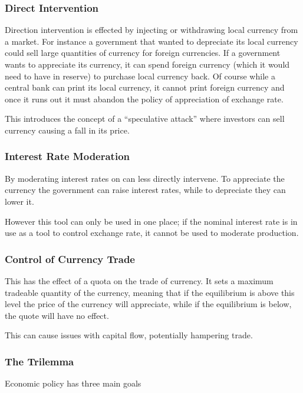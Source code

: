 \documentclass[12pt]{report}
\begin{document}
\begin{flushleft}
\subsubsection*{Direct Intervention}

Direction intervention is effected by injecting or withdrawing local currency
from a market. For instance a government that wanted to depreciate its local
currency could sell large quantities of currency for foreign currencies. If
a government wants to appreciate its currency, it can spend foreign currency
(which it would need to have in reserve) to purchase local currency back. Of
course while a central bank can print its local currency, it cannot print
foreign currency and once it runs out it must abandon the policy of
appreciation of exchange rate. \par
This introduces the concept of a ``speculative attack'' where investors can
sell currency causing a fall in its price.

\subsubsection*{Interest Rate Moderation}

By moderating interest rates on can less directly intervene. To appreciate the
currency the government can raise interest rates, while to depreciate they can
lower it. \par
However this tool can only be used in one place; if the nominal interest rate
is in use as a tool to control exchange rate, it cannot be used to moderate
production.

\subsubsection*{Control of Currency Trade}

This has the effect of a quota on the trade of currency. It sets a maximum
tradeable quantity of the currency, meaning that if the equilibrium is above
this level the price of the currency will appreciate, while if the equilibrium
is below, the quote will have no effect. \par
This can cause issues with capital flow, potentially hampering trade.

\subsubsection*{The Trilemma}

Economic policy has three main goals


\end{flushleft}
\end{document}

